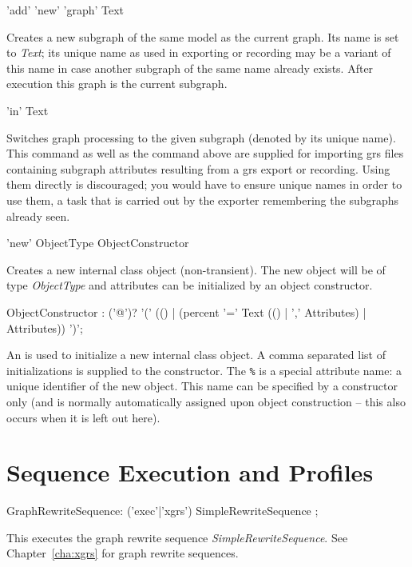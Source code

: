 \begin{rail}
  'add' 'new' 'graph' Text
\end{rail}
Creates a new subgraph of the same model as the current graph.
Its name is set to \emph{Text}; its unique name as used in exporting or recording may be a variant of this name in case another subgraph of the same name already exists.
After execution this graph is the current subgraph.

\begin{rail}
  'in' Text
\end{rail}
Switches graph processing to the given subgraph (denoted by its unique name).
This command as well as the command above are supplied for importing grs files containing subgraph attributes resulting from a grs export or recording.
Using them directly is discouraged; you would have to ensure unique names in order to use them, a task that is carried out by the exporter remembering the subgraphs already seen.

\begin{rail}
  'new' ObjectType ObjectConstructor
\end{rail}
Creates a new internal class object (non-transient).
The new object will be of type \emph{ObjectType} and attributes can be initialized by an object constructor.

\makeatletter
\begin{rail}
  ObjectConstructor : ('@')? '(' (() | (percent '=' Text (() | ',' Attributes) | Attributes)) ')';
\end{rail}\indexmain{\texttt{\%}}
\makeatother
An  is used to initialize a new internal class object.
A comma separated list of  initializations is supplied to the constructor.
The \texttt{\%} is a special attribute name: a unique identifier of the new object.
This name can be specified by a constructor only (and is normally automatically assigned upon object construction -- this also occurs when it is left out here).


\section{Sequence Execution and Profiles}\label{grsthings}

\begin{rail}
  GraphRewriteSequence: ('exec'|'xgrs') SimpleRewriteSequence ;
\end{rail}
This executes the graph rewrite sequence \emph{SimpleRewriteSequence}.
See Chapter~\ref{cha:xgrs} for graph rewrite sequences.

